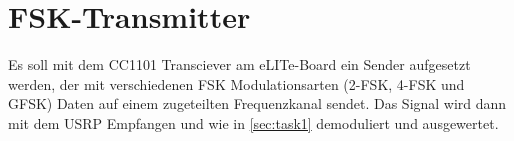 \newpage
\section{FSK-Transmitter}\label{sec:task2}


Es soll mit dem CC1101 Transciever am eLITe-Board ein Sender aufgesetzt werden, der mit verschiedenen FSK Modulationsarten (2-FSK, 4-FSK und GFSK) Daten auf einem zugeteilten Frequenzkanal sendet. Das Signal wird dann mit dem USRP Empfangen und wie in \autoref{sec:task1} demoduliert und ausgewertet.

